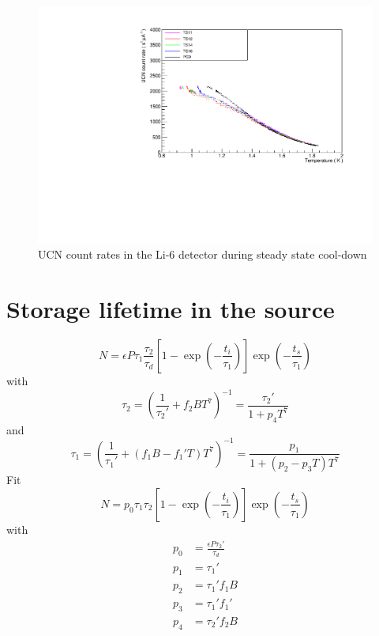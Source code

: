 \documentclass[10pt,letterpaper]{article}
\begin{document}
\begin{figure}
\centering
\includegraphics[width=\textwidth,page=1]{../steady_state/li6RateVsTempRun1163.pdf}
\caption{UCN count rates in the Li-6 detector during steady state cool-down}
\label{fig:steadyCool}
\end{figure}




\section{Storage lifetime in the source}
\label{sec:storagelifetime}

\iffalse

\begin{equation}
N = \epsilon P \tau_1 \frac{\tau_2}{\tau_d} \left[ 1 - \exp \left( -\frac{t_i}{\tau_1} \right) \right] \exp \left( -\frac{t_s}{\tau_1} \right)
\end{equation}
with
\begin{equation}
\tau_2 = \left( \frac{1}{\tau_2'} + f_2 B T^7 \right) ^{-1} = \frac{\tau_2'}{1 + p_4 T^7}
\end{equation}
and
\begin{equation}
\tau_1 = \left( \frac{1}{\tau_1'} + (f_1 B - f_1' T) T^7 \right) ^{-1} = \frac{p_1}{1 + (p_2 - p_3 T) T^7}
\end{equation}
Fit
\begin{equation}
N = p_0 \tau_1 \tau_2
    \left[ 1 - \exp \left( -\frac{t_i}{\tau_1} \right) \right]
    \exp \left( -\frac{t_s}{\tau_1} \right)
\end{equation}
with
\begin{eqnarray}
p_0 &= \frac{\epsilon P \tau_2'}{\tau_d} \\
p_1 &= \tau_1' \\
p_2 &= \tau_1' f_1 B \\
p_3 &= \tau_1' f_1' \\
p_4 &= \tau_2' f_2 B
\end{eqnarray}
\end{document}
